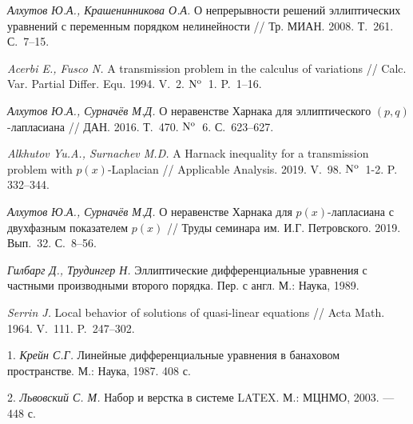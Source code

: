   \emph{Алхутов Ю.А., Крашенинникова О.А.} О непрерывности решений эллиптических уравнений с переменным порядком нелинейности // Тр. МИАН. 2008. Т.~261. С.~7--15.


 \emph{Acerbi E., Fusco N.} A transmission problem in the calculus of variations // Calc. Var. Partial Differ. Equ. 1994. V.~2.  ${\rm N^o}$\, 1. P.~1--16.


 \emph{Алхутов Ю.А., Сурначёв М.Д.} О неравенстве Харнака для эллиптического $(p,q)$-лапласиана // ДАН. 2016. Т.~470. ${\rm N^o}$\, 6. С.~623--627.

 \emph{Alkhutov Yu.A., Surnachev M.D.} A Harnack inequality for a transmission problem with $p(x)$-Laplacian // Applicable Analysis. 2019. V.~98. ${\rm N^o}$\, 1-2. P. 332--344.

 \emph{Алхутов Ю.А., Сурначёв М.Д.} О неравенстве Харнака для $p(x)$-лапласиана с двухфазным показателем $p(x)$ // Труды семинара им. И.Г. Петровского. 2019. Вып.~32. С.~8--56.


 \emph{Гилбарг Д., Трудингер Н.} Эллиптические дифференциальные уравнения с частными производными второго порядка. Пер. с англ. М.: Наука, 1989.

 \emph{Serrin J.} Local behavior of solutions of quasi-linear equations // Acta Math. 1964. V.~111. P.~247--302.



1. {\it Крейн С.Г.} Линейные дифференциальные уравнения в банаховом пространстве. М.: Наука, 1987. 408 с.

2. {\it Львовский С. М.} Набор и верстка в системе LATEX. М.: МЦНМО, 2003. — 448 с.

\fi
